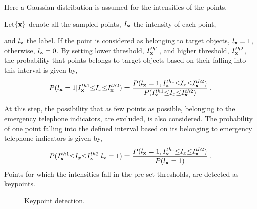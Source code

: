Here a Gaussian distribution is assumed for the intensities of the points.




Let$\{\bf{x}\}$ denote all the sampled points, $I_{\bf{x}}$ the intensity of each point, 
and $l_{\bf{x}}$ the label. If the point is considered as belonging to target objects, $l_{\bf{x}}=1$, otherwise, $l_{\bf{x}}=0$. By setting lower threshold, $I^{th1}_{\bf{x}}$,  and higher threshold, $I^{th2}_{\bf{x}}$, the probability that points belongs to target objects based on their falling into this interval is given by,
\begin{equation}
P(l_{\bf{x}}=1|I^{th1}_{\bf{x}}{\leq}I_x{\leq}{I^{th2}_{\bf{x}}})=
\frac
{P(l_{\bf{x}}=1,I^{th1}_{\bf{x}}{\leq}I_x{\leq}{I^{th2}_{\bf{x}}})} {P(I^{th1}_{\bf{x}}{\leq}I_x{\leq}{I^{th2}_{\bf{x}}})}\;.
\label{eq1}
\end{equation}



At this step, the possibility that as few points as possible, belonging to the emergency telephone indicators, are excluded, is also considered. The probability of one point falling into the defined interval based on its belonging to emergency telephone indicators is given by,
\begin{equation}
P(I^{th1}_{\bf{x}}{\leq}I_x{\leq}{I^{th2}_{\bf{x}}}|l_{\bf{x}}=1)=
\frac
{P(l_{\bf{x}}=1,I^{th1}_{\bf{x}}{\leq}I_x{\leq}{I^{th2}_{\bf{x}}})} {P(l_{\bf{x}}=1)}\;.
\label{eq1.1}
\end{equation}
Points for which the intensities fall in the pre-set thresholds, are detected as keypoints.
\begin{figure}
\centering
{}
\caption[Keypoint detection]{Keypoint detection. }
\label{fig:secc}
\end{figure}


